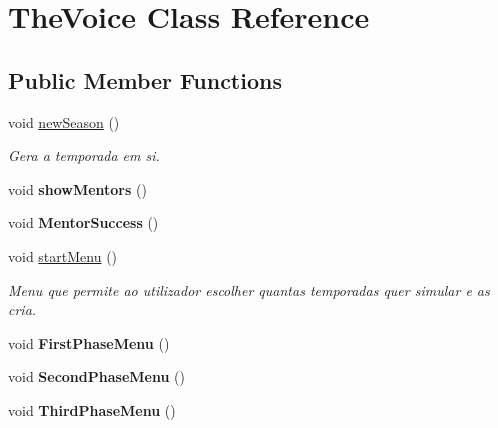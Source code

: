 \hypertarget{class_the_voice}{}\section{The\+Voice Class Reference}
\label{class_the_voice}
\subsection*{Public Member Functions}
\begin{DoxyCompactItemize}
\item 
\hypertarget{class_the_voice_a537aa6c8715a3a35bbf356155c1b237c}{}\label{class_the_voice_a537aa6c8715a3a35bbf356155c1b237c} 
void \hyperlink{class_the_voice_a537aa6c8715a3a35bbf356155c1b237c}{new\+Season} ()
\begin{DoxyCompactList}\small\item\em Gera a temporada em si. \end{DoxyCompactList}\item 
\hypertarget{class_the_voice_a2014a3032c581418fd494b2cdf21aeb3}{}\label{class_the_voice_a2014a3032c581418fd494b2cdf21aeb3} 
void {\bfseries show\+Mentors} ()
\item 
\hypertarget{class_the_voice_a1bfa4fad073a1f0bb1fef387c0da25b4}{}\label{class_the_voice_a1bfa4fad073a1f0bb1fef387c0da25b4} 
void {\bfseries Mentor\+Success} ()
\item 
\hypertarget{class_the_voice_aed5fa5d641c7d0961d56b227d2f18069}{}\label{class_the_voice_aed5fa5d641c7d0961d56b227d2f18069} 
void \hyperlink{class_the_voice_aed5fa5d641c7d0961d56b227d2f18069}{start\+Menu} ()
\begin{DoxyCompactList}\small\item\em Menu que permite ao utilizador escolher quantas temporadas quer simular e as cria. \end{DoxyCompactList}\item 
\hypertarget{class_the_voice_a165f92ac54217dcb4d95202c55820fee}{}\label{class_the_voice_a165f92ac54217dcb4d95202c55820fee} 
void {\bfseries First\+Phase\+Menu} ()
\item 
\hypertarget{class_the_voice_a88648b97a83c8fe08fb3c41faf51ffef}{}\label{class_the_voice_a88648b97a83c8fe08fb3c41faf51ffef} 
void {\bfseries Second\+Phase\+Menu} ()
\item 
\hypertarget{class_the_voice_a6a00ee6b37ae47508647ab54f4a5e6f9}{}\label{class_the_voice_a6a00ee6b37ae47508647ab54f4a5e6f9} 
void {\bfseries Third\+Phase\+Menu} ()
\item 

\end{DoxyCompactItemize}
